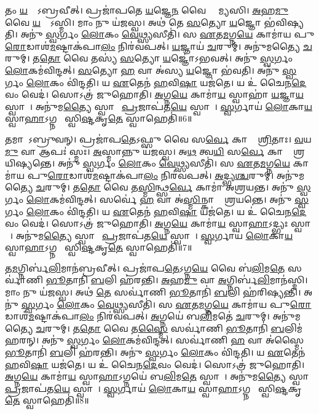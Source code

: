    𑌤𑌂 \ul{𑌯}𑌜𑍍𑌞𑍋᳚𑌽𑌬𑍍𑌰𑌵𑍀𑌤𑍍।
   𑌪𑍍𑌰𑌜𑌾॑𑌪𑌤𑍇 \ul{𑌯}𑌜𑍍𑌞𑍇\ul{𑌨} 𑌵𑍈 𑌶𑍍𑌰𑌾᳚𑌮𑍍𑌯𑌸𑌿।
   \ul{𑌅}𑌹\ul{𑌮𑍁} 𑌵𑍈 \ul{𑌯}𑌜𑍍𑌞𑍋᳚𑌽𑌸𑍍𑌮𑌿।
   𑌮𑌾𑌂 𑌨𑍁 𑌯॑𑌜𑌸𑍍𑌵।
   𑌅𑌥॑ 𑌤𑍇 \ul{𑌸}𑌤𑍍𑌯𑍋 \ul{𑌯}𑌜𑍍𑌞𑍋 𑌭॑𑌵𑌿𑌷𑍍𑌯𑌤𑌿।
   𑌅𑌨𑍁॑ \ul{𑌸𑍍𑌵}𑌰𑍍𑌗𑌂 \ul{𑌲𑍋}𑌕𑌂 \ul{𑌵𑍇}𑌥𑍍𑌸𑍍𑌯𑌸𑍀𑌤𑌿॑।
   𑌸 \ul{𑌏}𑌤\ul{𑌮}𑌗𑍍𑌨\ul{𑌯𑍇} 𑌕𑌾𑌮𑌾॑𑌯 𑌪𑍁\ul{𑌰𑍋}𑌡𑌾𑌶॑\ul{𑌮}𑌷𑍍𑌟𑌾𑌕॑𑌪𑌾\ul{𑌲𑌂} 𑌨𑌿𑌰॑𑌵𑌪𑌤𑍍।
   \ul{𑌯}𑌜𑍍𑌞𑌾𑌯॑ \ul{𑌚}𑌰𑍁𑌮𑍍।
   𑌅𑌨𑍁॑𑌮𑌤𑍍𑌯𑍈 \ul{𑌚}𑌰𑍁𑌮𑍍।
   𑌤\ul{𑌤𑍋} 𑌵𑍈 𑌤𑌸𑍍𑌯॑ \ul{𑌸}𑌤𑍍𑌯𑍋 \ul{𑌯}𑌜𑍍𑌞𑍋॑𑌽𑌭𑌵𑌤𑍍।
   𑌅𑌨𑍁॑ \ul{𑌸𑍍𑌵}𑌰𑍍𑌗𑌂 \ul{𑌲𑍋}𑌕𑌮॑𑌵𑌿𑌨𑍍𑌦𑌤𑍍।
   \ul{𑌸}𑌤𑍍𑌯𑍋 \ul{𑌹} 𑌵𑌾 𑌅॑𑌸𑍍𑌯 \ul{𑌯}𑌜𑍍𑌞𑍋 𑌭॑𑌵𑌤𑌿।
   𑌅𑌨𑍁॑ \ul{𑌸𑍍𑌵}𑌰𑍍𑌗𑌂 \ul{𑌲𑍋}𑌕𑌂 𑌵𑌿॑𑌨𑍍𑌦𑌤𑌿।
   𑌯 \ul{𑌏}𑌤𑍇𑌨॑ \ul{𑌹}𑌵𑌿\ul{𑌷𑌾} 𑌯𑌜॑𑌤𑍇।
   𑌯 𑌉॑ 𑌚𑍈𑌨\ul{𑌦𑍇}𑌵𑌂 𑌵𑍇𑌦॑।
   𑌸𑍋𑌽𑌤𑍍𑌰॑ 𑌜𑍁𑌹𑍋𑌤𑌿।
   \ul{𑌅}𑌗𑍍𑌨\ul{𑌯𑍇} 𑌕𑌾𑌮𑌾॑\ul{𑌯} 𑌸𑍍𑌵𑌾𑌹𑌾॑ \ul{𑌯}𑌜𑍍𑌞𑌾\ul{𑌯} 𑌸𑍍𑌵𑌾𑌹𑌾᳚।
   𑌅𑌨𑍁॑𑌮\ul{𑌤𑍍𑌯𑍈} 𑌸𑍍𑌵𑌾𑌹𑌾᳚ \ul{𑌪𑍍𑌰}𑌜𑌾𑌪॑𑌤\ul{𑌯𑍇} 𑌸𑍍𑌵𑌾𑌹𑌾᳚।
   \ul{𑌸𑍍𑌵}𑌰𑍍𑌗𑌾𑌯॑ \ul{𑌲𑍋}𑌕𑌾\ul{𑌯} 𑌸𑍍𑌵𑌾\ul{𑌹𑌾}𑌽𑌗𑍍𑌨𑌯𑍇᳚ 𑌸𑍍𑌵𑌿\ul{𑌷𑍍𑌟}𑌕𑍃\ul{𑌤𑍇} 𑌸𑍍𑌵𑌾𑌹𑍇𑌤𑌿॑॥6॥

   𑌤𑌮𑌾𑌪𑍋᳚𑌽𑌬𑍍𑌰𑍁𑌵𑌨𑍍।
   𑌪𑍍𑌰𑌜𑌾॑𑌪\ul{𑌤𑍇}𑌽𑌫𑍍𑌸𑍁 𑌵𑍈 𑌸\ul{𑌰𑍍𑌵𑍇} 𑌕𑌾𑌮𑌾𑌃᳚ \ul{𑌶𑍍𑌰𑌿}𑌤𑌾𑌃।
   \ul{𑌵}𑌯\ul{𑌮𑍁} 𑌵𑌾 𑌆𑌪𑌃॑ 𑌸𑍍𑌮𑌃।
   \ul{𑌅}𑌸𑍍𑌮𑌾𑌨𑍍𑌨𑍁 𑌯॑𑌜𑌸𑍍𑌵।
   𑌅\ul{𑌥} 𑌤𑍍𑌵\ul{𑌯𑌿} 𑌸\ul{𑌰𑍍𑌵𑍇} 𑌕𑌾𑌮𑌾𑌃᳚ 𑌶𑍍𑌰𑌯𑌿𑌷𑍍𑌯𑌨𑍍𑌤𑍇।
   𑌅𑌨𑍁॑ \ul{𑌸𑍍𑌵}𑌰𑍍𑌗𑌂 \ul{𑌲𑍋}𑌕𑌂 \ul{𑌵𑍇}𑌥𑍍𑌸𑍍𑌯𑌸𑍀𑌤𑌿॑।
   𑌸 \ul{𑌏}𑌤\ul{𑌮}𑌗𑍍𑌨\ul{𑌯𑍇} 𑌕𑌾𑌮𑌾॑𑌯 𑌪𑍁\ul{𑌰𑍋}𑌡𑌾𑌶॑\ul{𑌮}𑌷𑍍𑌟𑌾𑌕॑𑌪𑌾\ul{𑌲𑌂} 𑌨𑌿𑌰॑𑌵𑌪𑌤𑍍।
   \ul{𑌅}𑌦𑍍𑌭𑍍𑌯\ul{𑌶𑍍𑌚}𑌰𑍁𑌮𑍍।
   𑌅𑌨𑍁॑𑌮𑌤𑍍𑌯𑍈 \ul{𑌚}𑌰𑍁𑌮𑍍।
   𑌤\ul{𑌤𑍋} 𑌵𑍈 𑌤\ul{𑌸𑍍𑌮𑌿}𑌨𑍍𑌥𑍍𑌸\ul{𑌰𑍍𑌵𑍇} 𑌕𑌾𑌮𑌾॑ 𑌅𑌶𑍍𑌰𑌯𑌨𑍍𑌤।
   𑌅𑌨𑍁॑ \ul{𑌸𑍍𑌵}𑌰𑍍𑌗𑌂 \ul{𑌲𑍋}𑌕𑌮॑𑌵𑌿𑌨𑍍𑌦𑌤𑍍।
   𑌸𑌰𑍍𑌵𑍇॑ \ul{𑌹} 𑌵𑌾 𑌅॑\ul{𑌸𑍍𑌮𑌿}𑌨𑍍𑌕𑌾𑌮𑌾𑌃᳚ 𑌶𑍍𑌰𑌯𑌨𑍍𑌤𑍇।
   𑌅𑌨𑍁॑ \ul{𑌸𑍍𑌵}𑌰𑍍𑌗𑌂 \ul{𑌲𑍋}𑌕𑌂 𑌵𑌿॑𑌨𑍍𑌦𑌤𑌿।
   𑌯 \ul{𑌏}𑌤𑍇𑌨॑ \ul{𑌹}𑌵𑌿\ul{𑌷𑌾} 𑌯𑌜॑𑌤𑍇।
   𑌯 𑌉॑ 𑌚𑍈𑌨\ul{𑌦𑍇}𑌵𑌂 𑌵𑍇𑌦॑।
   𑌸𑍋𑌽𑌤𑍍𑌰॑ 𑌜𑍁𑌹𑍋𑌤𑌿।
   \ul{𑌅}𑌗𑍍𑌨\ul{𑌯𑍇} 𑌕𑌾𑌮𑌾॑\ul{𑌯} 𑌸𑍍𑌵𑌾\ul{𑌹𑌾}𑌽𑌦𑍍𑌭𑍍𑌯𑌃 𑌸𑍍𑌵𑌾𑌹𑌾᳚।
   𑌅𑌨𑍁॑𑌮\ul{𑌤𑍍𑌯𑍈} 𑌸𑍍𑌵𑌾𑌹𑌾᳚ \ul{𑌪𑍍𑌰}𑌜𑌾𑌪॑𑌤\ul{𑌯𑍇} 𑌸𑍍𑌵𑌾𑌹𑌾᳚।
   \ul{𑌸𑍍𑌵}𑌰𑍍𑌗𑌾𑌯॑ \ul{𑌲𑍋}𑌕𑌾\ul{𑌯} 𑌸𑍍𑌵𑌾\ul{𑌹𑌾}𑌽𑌗𑍍𑌨𑌯𑍇᳚ 𑌸𑍍𑌵𑌿\ul{𑌷𑍍𑌟}𑌕𑍃\ul{𑌤𑍇} 𑌸𑍍𑌵𑌾𑌹𑍇𑌤𑌿॑॥7॥

   𑌤\ul{𑌮}𑌗𑍍𑌨𑌿𑌰𑍍𑌬॑\ul{𑌲𑌿}𑌮𑌾𑌨॑𑌬𑍍𑌰𑌵𑍀𑌤𑍍।
   𑌪𑍍𑌰𑌜𑌾॑𑌪\ul{𑌤𑍇}𑌽𑌗𑍍𑌨\ul{𑌯𑍇} 𑌵𑍈 𑌬॑\ul{𑌲𑌿}𑌮\ul{𑌤𑍇} 𑌸𑌰𑍍𑌵𑌾॑𑌣𑌿 \ul{𑌭𑍂}𑌤𑌾𑌨𑌿॑ \ul{𑌬}𑌲𑌿 𑌹॑𑌰𑌨𑍍𑌤𑌿।
   \ul{𑌅}𑌹\ul{𑌮𑍁} 𑌵𑌾 \ul{𑌅}𑌗𑍍𑌨𑌿𑌰𑍍𑌬॑\ul{𑌲𑌿}𑌮𑌾𑌨॑𑌸𑍍𑌮𑌿।
   𑌮𑌾𑌂 𑌨𑍁 𑌯॑𑌜𑌸𑍍𑌵।
   𑌅𑌥॑ \ul{𑌤𑍇} 𑌸𑌰𑍍𑌵𑌾॑𑌣𑌿 \ul{𑌭𑍂}𑌤𑌾𑌨𑌿॑ \ul{𑌬}𑌲𑌿 𑌹॑𑌰𑌿𑌷𑍍𑌯𑌨𑍍𑌤𑌿।
   𑌅𑌨𑍁॑ \ul{𑌸𑍍𑌵}𑌰𑍍𑌗𑌂 \ul{𑌲𑍋}𑌕𑌂 \ul{𑌵𑍇}𑌥𑍍𑌸𑍍𑌯𑌸𑍀𑌤𑌿॑।
   𑌸 \ul{𑌏}𑌤\ul{𑌮}𑌗𑍍𑌨\ul{𑌯𑍇} 𑌕𑌾𑌮𑌾॑𑌯 𑌪𑍁\ul{𑌰𑍋}𑌡𑌾𑌶॑\ul{𑌮}𑌷𑍍𑌟𑌾𑌕॑𑌪𑌾\ul{𑌲𑌂} 𑌨𑌿𑌰॑𑌵𑌪𑌤𑍍।
   \ul{𑌅}𑌗𑍍𑌨𑌯𑍇॑ 𑌬\ul{𑌲𑌿}𑌮𑌤𑍇॑ \ul{𑌚}𑌰𑍁𑌮𑍍।
   𑌅𑌨𑍁॑𑌮𑌤𑍍𑌯𑍈 \ul{𑌚}𑌰𑍁𑌮𑍍।
   𑌤\ul{𑌤𑍋} 𑌵𑍈 𑌤\ul{𑌸𑍍𑌮𑍈} 𑌸𑌰𑍍𑌵𑌾॑𑌣𑌿 \ul{𑌭𑍂}𑌤𑌾𑌨𑌿॑ \ul{𑌬}𑌲𑌿𑌮॑𑌹𑌰𑌨𑍍।
   𑌅𑌨𑍁॑ \ul{𑌸𑍍𑌵}𑌰𑍍𑌗𑌂 \ul{𑌲𑍋}𑌕𑌮॑𑌵𑌿𑌨𑍍𑌦𑌤𑍍।
   𑌸𑌰𑍍𑌵𑌾॑𑌣𑌿 \ul{𑌹} 𑌵𑌾 𑌅॑𑌸𑍍𑌮𑍈 \ul{𑌭𑍂}𑌤𑌾𑌨𑌿॑ \ul{𑌬}𑌲𑌿 𑌹॑𑌰𑌨𑍍𑌤𑌿।
   𑌅𑌨𑍁॑ \ul{𑌸𑍍𑌵}𑌰𑍍𑌗𑌂 \ul{𑌲𑍋}𑌕𑌂 𑌵𑌿॑𑌨𑍍𑌦𑌤𑌿।
   𑌯 \ul{𑌏}𑌤𑍇𑌨॑ \ul{𑌹}𑌵𑌿\ul{𑌷𑌾} 𑌯𑌜॑𑌤𑍇।
   𑌯 𑌉॑ 𑌚𑍈𑌨\ul{𑌦𑍇}𑌵𑌂 𑌵𑍇𑌦॑।
   𑌸𑍋𑌽𑌤𑍍𑌰॑ 𑌜𑍁𑌹𑍋𑌤𑌿।
   \ul{𑌅}𑌗𑍍𑌨\ul{𑌯𑍇} 𑌕𑌾𑌮𑌾॑\ul{𑌯} 𑌸𑍍𑌵𑌾\ul{𑌹𑌾}𑌽𑌗𑍍𑌨𑌯𑍇॑ 𑌬\ul{𑌲𑌿}𑌮\ul{𑌤𑍇} 𑌸𑍍𑌵𑌾𑌹𑌾᳚।
   𑌅𑌨𑍁॑𑌮\ul{𑌤𑍍𑌯𑍈} 𑌸𑍍𑌵𑌾𑌹𑌾᳚ \ul{𑌪𑍍𑌰}𑌜𑌾𑌪॑𑌤\ul{𑌯𑍇} 𑌸𑍍𑌵𑌾𑌹𑌾᳚।
   \ul{𑌸𑍍𑌵}𑌰𑍍𑌗𑌾𑌯॑ \ul{𑌲𑍋}𑌕𑌾\ul{𑌯} 𑌸𑍍𑌵𑌾\ul{𑌹𑌾}𑌽𑌗𑍍𑌨𑌯𑍇᳚ 𑌸𑍍𑌵𑌿\ul{𑌷𑍍𑌟}𑌕𑍃\ul{𑌤𑍇} 𑌸𑍍𑌵𑌾𑌹𑍇𑌤𑌿॑॥8॥

